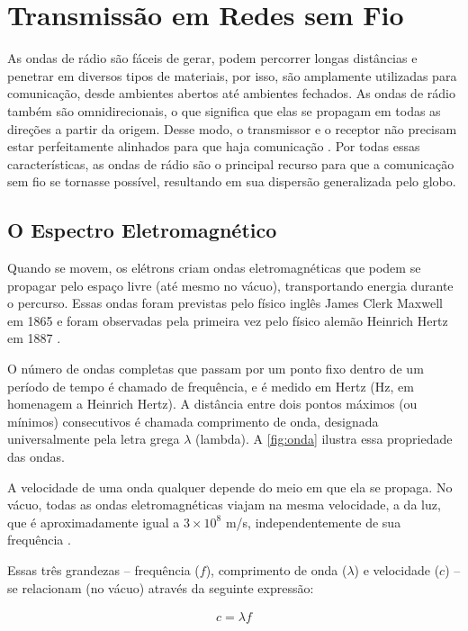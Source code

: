 \chapter{Transmissão em Redes sem Fio}
\label{cap:transmissao-redes-sem-fio}

As ondas de rádio são fáceis de gerar, podem percorrer longas distâncias e penetrar em diversos tipos de materiais, por isso, são amplamente utilizadas para comunicação, desde ambientes abertos até ambientes fechados. As ondas de rádio também são omnidirecionais, o que significa que elas se propagam em todas as direções a partir da origem. Desse modo, o transmissor e o receptor não precisam estar perfeitamente alinhados para que haja comunicação \cite{tanenbaum2011}. Por todas essas características, as ondas de rádio são o principal recurso para que a comunicação sem fio se tornasse possível, resultando em sua dispersão generalizada pelo globo.

\section{O Espectro Eletromagnético}
\label{sec:espectro-eletromagnetico}

Quando se movem, os elétrons criam ondas eletromagnéticas que podem se propagar pelo espaço livre (até mesmo no vácuo), transportando energia durante o percurso. Essas ondas foram previstas pelo físico inglês James Clerk Maxwell em 1865 e foram observadas pela primeira vez pelo físico alemão Heinrich Hertz em 1887 \cite{tanenbaum2011}.

O número de ondas completas que passam por um ponto fixo dentro de um período de tempo é chamado de frequência, e é medido em Hertz (Hz, em homenagem a Heinrich Hertz). A distância entre dois pontos máximos (ou mínimos) consecutivos é chamada comprimento de onda, designada universalmente pela letra grega $\lambda$ (lambda). A \autoref{fig:onda} ilustra essa propriedade das ondas.

A velocidade de uma onda qualquer depende do meio em que ela se propaga. No vácuo, todas as ondas eletromagnéticas viajam na mesma velocidade, a da luz, que é aproximadamente igual a $3 \times 10^8$ m/s, independentemente de sua frequência \cite{tanenbaum2011}.

Essas três grandezas -- frequência ($f$), comprimento de onda ($\lambda$) e velocidade ($c$) -- se relacionam (no vácuo) através da seguinte expressão:

\begin{equation}
	\begin{aligned}
		c = \lambda f
	\end{aligned}
\end{equation}


